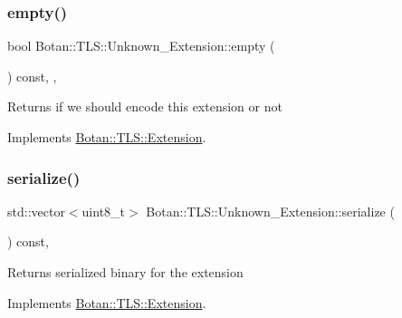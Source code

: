 \subsubsection{\texorpdfstring{empty()}{empty()}}
{\footnotesize\ttfamily bool Botan\+::\+T\+L\+S\+::\+Unknown\+\_\+\+Extension\+::empty (\begin{DoxyParamCaption}{ }\end{DoxyParamCaption}) const\hspace{0.3cm}{\ttfamily [inline]}, {\ttfamily [override]}, {\ttfamily [virtual]}}

\begin{DoxyReturn}{Returns}
if we should encode this extension or not 
\end{DoxyReturn}


Implements \hyperlink{class_botan_1_1_t_l_s_1_1_extension_aa850b9be2322f94e7c65e583cd51acc5}{Botan\+::\+T\+L\+S\+::\+Extension}.

\mbox{\label{class_botan_1_1_t_l_s_1_1_unknown___extension_a1a706433e22a0b2bb3ab044fadd4f5a1}} 
\subsubsection{\texorpdfstring{serialize()}{serialize()}}
{\footnotesize\ttfamily std\+::vector$<$uint8\+\_\+t$>$ Botan\+::\+T\+L\+S\+::\+Unknown\+\_\+\+Extension\+::serialize (\begin{DoxyParamCaption}{ }\end{DoxyParamCaption}) const\hspace{0.3cm}{\ttfamily [override]}, {\ttfamily [virtual]}}

\begin{DoxyReturn}{Returns}
serialized binary for the extension 
\end{DoxyReturn}


Implements \hyperlink{class_botan_1_1_t_l_s_1_1_extension_a56788726ad2526db54e5a26039cb69db}{Botan\+::\+T\+L\+S\+::\+Extension}.

\mbox{\label{class_botan_1_1_t_l_s_1_1_unknown___extension_a3662bce2ca66c928000baba33369623d}} 
